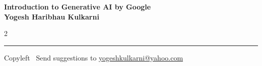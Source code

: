 \documentclass[8pt,landscape]{article}
\begin{document}
\footnotesize


\begin{center}
\Large{\textbf{Introduction to Generative AI by Google\\ Yogesh Haribhau Kulkarni}}  
\end{center}

\begin{multicols}{2}

\end{multicols}

\rule{\linewidth}{0.25pt}
\scriptsize
Copyleft \textcopyleft\  Send suggestions to 
\href{http://www.yogeshkulkarni.com}{yogeshkulkarni@yahoo.com}
\end{document}
